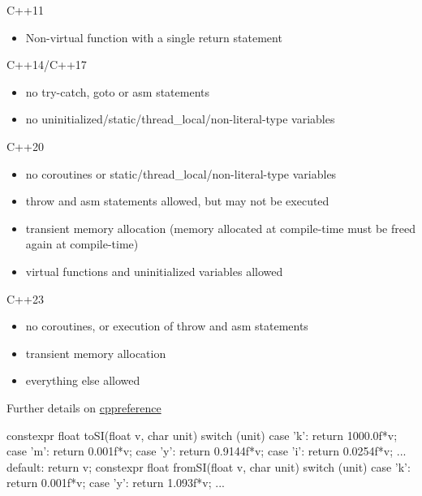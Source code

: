 \begin{frame}[fragile,shrink=15]
   \begin{alertblock}{C++11}
     \begin{itemize}
     \item Non-virtual function with a single return statement
     \end{itemize}
   \end{alertblock}
   \begin{alertblock}{C++14/C++17}
    \begin{itemize}
    \item no try-catch, goto or asm statements
    \item no uninitialized/static/thread\_local/non-literal-type variables
    \end{itemize}
  \end{alertblock}
   \begin{alertblock}{C++20}
    \begin{itemize}
    \item no coroutines or static/thread\_local/non-literal-type variables
    \item throw and asm statements allowed, but may not be executed
    \item transient memory allocation
          (memory allocated at compile-time must be freed again at compile-time)
    \item virtual functions and uninitialized variables allowed
    \end{itemize}
  \end{alertblock}
  \begin{alertblock}{C++23}
    \begin{itemize}
    \item no coroutines, or execution of throw and asm statements
    \item transient memory allocation
    \item everything else allowed
    \end{itemize}
  \end{alertblock}
  Further details on \href{https://en.cppreference.com/w/cpp/language/constexpr}{cppreference}
\end{frame}

\begin{frame}[fragile]
  \begin{cppcode*}{}
    constexpr float toSI(float v, char unit) {
      switch (unit) {
      case 'k': return 1000.0f*v;
      case 'm': return 0.001f*v;
      case 'y': return 0.9144f*v;
      case 'i': return 0.0254f*v;
      ...
      default: return v;
      }
    }
    constexpr float fromSI(float v, char unit) {
      switch (unit) {
        case 'k': return 0.001f*v;
        case 'y': return 1.093f*v;
      ...
      }
    }
  \end{cppcode*}
\end{frame}

